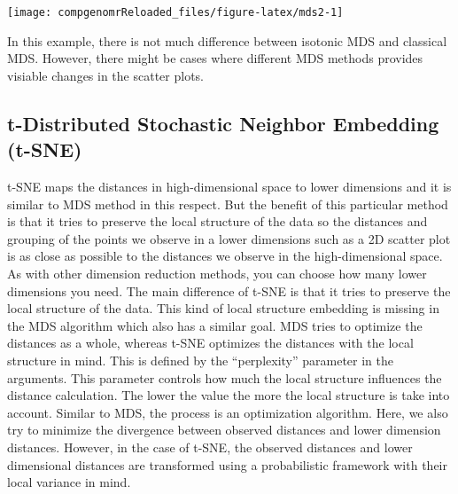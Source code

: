 \documentclass[12pt,]{krantz}
\newenvironment{Shaded}{\begin{snugshade}}{\end{snugshade}}
\newcommand{\CommentTok}[1]{\textcolor[rgb]{0.56,0.35,0.01}{\textit{#1}}}
\newcommand{\DataTypeTok}[1]{\textcolor[rgb]{0.13,0.29,0.53}{#1}}
\newcommand{\DecValTok}[1]{\textcolor[rgb]{0.00,0.00,0.81}{#1}}
\newcommand{\KeywordTok}[1]{\textcolor[rgb]{0.13,0.29,0.53}{\textbf{#1}}}
\newcommand{\NormalTok}[1]{#1}
\newcommand{\OperatorTok}[1]{\textcolor[rgb]{0.81,0.36,0.00}{\textbf{#1}}}
\newcommand{\StringTok}[1]{\textcolor[rgb]{0.31,0.60,0.02}{#1}}
\begin{document}
\begin{Shaded}
\end{Shaded}

\begin{center}\texttt{[image: compgenomrReloaded\_files/figure-latex/mds2-1]} \end{center}

In this example, there is not much difference between isotonic MDS and classical MDS. However, there might be cases where different MDS methods provides visiable changes in the scatter plots.

\hypertarget{t-distributed-stochastic-neighbor-embedding-t-sne}{%
\subsection{t-Distributed Stochastic Neighbor Embedding (t-SNE)}\label{t-distributed-stochastic-neighbor-embedding-t-sne}}

t-SNE maps the distances in high-dimensional space to lower dimensions and it is similar to MDS method in this respect. But the benefit of this particular method is that it tries to preserve the local structure of the data so the distances and grouping of the points we observe in a lower dimensions such as a 2D scatter plot is as close as possible to the distances we observe in the high-dimensional space. As with other dimension reduction methods, you can choose how many lower dimensions you need. The main difference of t-SNE is that it tries to preserve the local structure of the data. This kind of local structure embedding is missing in the MDS algorithm which also has a similar goal. MDS tries to optimize the distances as a whole, whereas t-SNE optimizes the distances with the local structure in mind. This is defined by the ``perplexity'' parameter in the arguments. This parameter controls how much the local structure influences the distance calculation. The lower the value the more the local structure is take into account. Similar to MDS, the process is an optimization algorithm. Here, we also try to minimize the divergence between observed distances and lower dimension distances. However, in the case of t-SNE, the observed distances and lower dimensional distances are transformed using a probabilistic framework with their local variance in mind.
\end{document}
